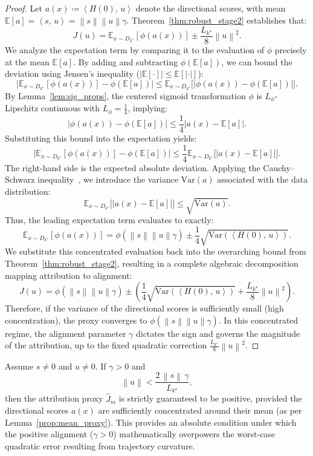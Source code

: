 \documentclass[bdcc,article,submit,pdftex]{Definitions/mdpi}
\newcommand{\ip}[2]{\left\langle #1,\,#2 \right\rangle}
\newcommand{\norm}[1]{\left\lVert #1 \right\rVert}
\newcommand{\E}{\mathbb{E}}
\newcommand{\tindex}{k^\star}
\newcommand{\utarget}{u}
\begin{document}
\begin{proof}
Let $a(x) \coloneqq \ip{H(0)}{\utarget}$ denote the directional scores, with mean $\E[a] = \ip{s}{\utarget} = \norm{s}\norm{\utarget}\gamma$.
Theorem~\ref{thm:robust_stage2} establishes that:
\[
J(\utarget) = \E_{x\sim D_{\tindex}}[\phi(a(x))] \pm \frac{L_{\tindex}}{8}\norm{\utarget}^2.
\]
We analyze the expectation term by comparing it to the evaluation of $\phi$ precisely at the mean $\E[a]$. 
By adding and subtracting $\phi(\E[a])$, we can bound the deviation using Jensen's inequality ($|\E[\cdot]| \le \E[|\cdot|]$):
\[
\Big|\E_{x\sim D_{\tindex}}[\phi(a(x))] - \phi(\E[a])\Big| \le \E_{x\sim D_{\tindex}}\Big[ \big| \phi(a(x)) - \phi(\E[a]) \big| \Big].
\]
By Lemma~\ref{lem:sig_props}, the centered sigmoid transformation $\phi$ is $L_\phi$-Lipschitz continuous with $L_\phi = \frac{1}{4}$, implying:
\[
\big| \phi(a(x)) - \phi(\E[a]) \big| \le \frac{1}{4} \big| a(x) - \E[a] \big|.
\]
Substituting this bound into the expectation yields:
\[
\Big|\E_{x\sim D_{\tindex}}[\phi(a(x))] - \phi(\E[a])\Big| \le \frac{1}{4} \E_{x\sim D_{\tindex}}\Big[ \big| a(x) - \E[a] \big| \Big].
\]
The right-hand side is the expected absolute deviation. Applying the Cauchy--Schwarz inequality~\cite{steele2004cauchy}, we introduce the variance $\mathrm{Var}(a)$ associated with the data distribution:
\[
\E_{x\sim D_{\tindex}}\Big[ \big| a(x) - \E[a] \big| \Big] \le \sqrt{\mathrm{Var}(a)}.
\]
Thus, the leading expectation term evaluates to exactly:
\[
\E_{x\sim D_{\tindex}}[\phi(a(x))] = \phi(\norm{s}\norm{\utarget}\gamma) \pm \frac{1}{4}\sqrt{\mathrm{Var}(\ip{H(0)}{\utarget})}.
\]
We substitute this concentrated evaluation back into the overarching bound from Theorem~\ref{thm:robust_stage2}, resulting in a complete algebraic decomposition mapping attribution to alignment:
\[
J(\utarget) = \phi(\norm{s}\norm{\utarget}\gamma) \pm \left( \frac{1}{4}\sqrt{\mathrm{Var}(\ip{H(0)}{\utarget})} + \frac{L_{\tindex}}{8}\norm{\utarget}^2 \right).
\]
Therefore, if the variance of the directional scores is sufficiently small (high concentration), the proxy converges to $\phi(\norm{s}\norm{\utarget}\gamma)$. In this concentrated regime, the alignment parameter $\gamma$ dictates the sign and governs the magnitude of the attribution, up to the fixed quadratic correction $\frac{L_{\tindex}}{8}\norm{\utarget}^2$.
\end{proof}

\begin{Lemma}
\label{lem:gamma_dom}
Assume $s\neq 0$ and $\utarget\neq 0$. If $\gamma>0$ and
\begin{equation}
\label{eq:gamma_dom}
\norm{\utarget} < \frac{2\,\norm{s}\,\gamma}{L_{\tindex}},
\end{equation}
then the attribution proxy $\widehat{J}_m$ is strictly guaranteed to be positive, provided the directional scores $a(x)$ are sufficiently concentrated around their mean (as per Lemma~\ref{prop:mean_proxy}). 
This provides an absolute condition under which the positive alignment ($\gamma>0$) mathematically overpowers the worst-case quadratic error resulting from trajectory curvature.
\end{Lemma}
\end{document}
